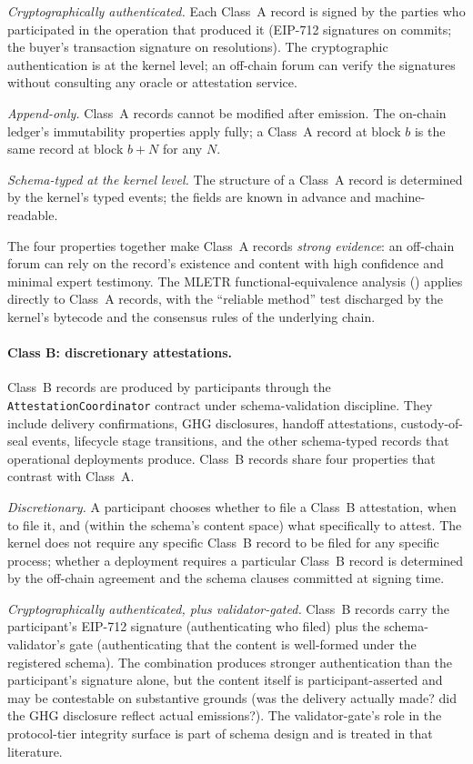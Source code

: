 \documentclass[11pt,a4paper]{article}
\theoremstyle{remark}
\begin{document}
\emph{Cryptographically authenticated.} Each Class~A record is
signed by the parties who participated in the operation that
produced it (EIP-712 signatures on commits; the buyer's
transaction signature on resolutions). The cryptographic
authentication is at the kernel level; an off-chain forum can
verify the signatures without consulting any oracle or
attestation service.

\emph{Append-only.} Class~A records cannot be modified after
emission. The on-chain ledger's immutability properties apply
fully; a Class~A record at block $b$ is the same record at block
$b + N$ for any $N$.

\emph{Schema-typed at the kernel level.} The structure of a
Class~A record is determined by the kernel's typed events; the
fields are known in advance and machine-readable.

The four properties together make Class~A records \emph{strong
evidence}: an off-chain forum can rely on the record's existence
and content with high confidence and minimal expert testimony.
The MLETR functional-equivalence analysis ()
applies directly to Class~A records, with the ``reliable method''
test discharged by the kernel's bytecode and the consensus rules
of the underlying chain.

\paragraph{Class B: discretionary attestations.}
Class~B records are produced by participants through the
\texttt{AttestationCoordinator} contract under
schema-validation discipline. They include delivery
confirmations, GHG disclosures, handoff attestations,
custody-of-seal events, lifecycle stage transitions, and the
other schema-typed records that operational deployments produce.
Class~B records share four properties that contrast with Class~A.

\emph{Discretionary.} A participant chooses whether to file a
Class~B attestation, when to file it, and (within the schema's
content space) what specifically to attest. The kernel does not
require any specific Class~B record to be filed for any specific
process; whether a deployment requires a particular Class~B
record is determined by the off-chain agreement and the schema
clauses committed at signing time.

\emph{Cryptographically authenticated, plus validator-gated.}
Class~B records carry the participant's EIP-712 signature
(authenticating who filed) plus the schema-validator's gate
(authenticating that the content is well-formed under the
registered schema). The combination produces stronger
authentication than the participant's signature alone, but the
content itself is participant-asserted and may be contestable on
substantive grounds (was the delivery actually made? did the GHG
disclosure reflect actual emissions?). The validator-gate's role
in the protocol-tier integrity surface is part of schema design
and is treated in that literature.
\end{document}
